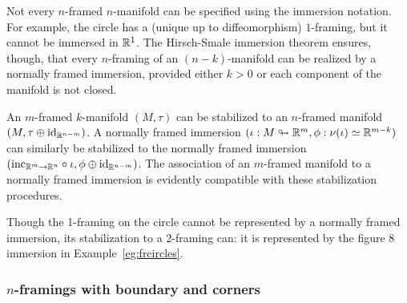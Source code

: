 \documentclass{amsart}
\begin{document}
\begin{remark}
Not every $n$-framed $n$-manifold can be specified using the immersion notation.  For example, the circle has a (unique up to diffeomorphism) $1$-framing, but it cannot be immersed in $\mathbb R^1$.  The Hirsch-Smale immersion theorem \cite{MR0119214, MR0105117} ensures, though, that every $n$-framing of an $(n-k)$-manifold can be realized by a normally framed immersion, provided either $k>0$ or each component of the manifold is not closed.
\end{remark} %

An $m$-framed $k$-manifold $(M,\tau)$ can be stabilized to an $n$-framed manifold $(M,\tau \oplus \mathrm{id}_{\mathbb R^{n-m}})$.  A normally framed immersion $(\iota: M \looparrowright \mathbb R^m, \phi : \nu(\iota) \simeq \mathbb R^{m-k})$ can similarly be stabilized to the normally framed immersion $(\mathrm{inc}_{\mathbb R^m \rightarrow \mathbb R^n} \circ \iota, \phi \oplus \mathrm{id}_{\mathbb R^{n-m}})$.  The association of an $m$-framed manifold to a normally framed immersion is evidently compatible with these stabilization procedures.

\begin{example}
Though the 1-framing on the circle cannot be represented by a normally framed immersion, its stabilization to a 2-framing can: it is represented by the figure 8 immersion in Example~\ref{eg:frcircles}.
\end{example}


\subsubsection{$n$-framings with boundary and corners}
\end{document}
